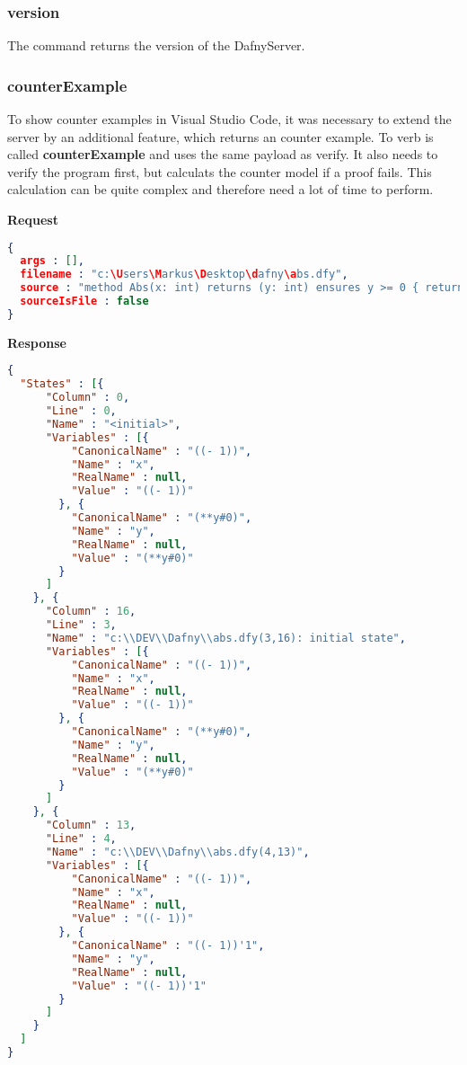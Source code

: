 \subsubsection{version}
The command returns the version of the DafnyServer.  


\subsubsection{counterExample}
To show counter examples in Visual Studio Code, it was necessary to extend the server by an additional feature, which returns an counter example. To verb is called \textbf{counterExample} and uses the same payload as verify. It also needs to verify the program first, but calculats the counter model if a proof fails. This calculation can be quite complex and therefore need a lot of time to perform.  

\textbf{Request}
\begin{lstlisting}[language=json,firstnumber=1]
{
  args : [],
  filename : "c:\Users\Markus\Desktop\dafny\abs.dfy",
  source : "method Abs(x: int) returns (y: int) ensures y >= 0 { return x;}",
  sourceIsFile : false
}

\end{lstlisting}

\textbf{Response}
\begin{lstlisting}[language=json,firstnumber=1]
{
  "States" : [{
      "Column" : 0,
      "Line" : 0,
      "Name" : "<initial>",
      "Variables" : [{
          "CanonicalName" : "((- 1))",
          "Name" : "x",
          "RealName" : null,
          "Value" : "((- 1))"
        }, {
          "CanonicalName" : "(**y#0)",
          "Name" : "y",
          "RealName" : null,
          "Value" : "(**y#0)"
        }
      ]
    }, {
      "Column" : 16,
      "Line" : 3,
      "Name" : "c:\\DEV\\Dafny\\abs.dfy(3,16): initial state",
      "Variables" : [{
          "CanonicalName" : "((- 1))",
          "Name" : "x",
          "RealName" : null,
          "Value" : "((- 1))"
        }, {
          "CanonicalName" : "(**y#0)",
          "Name" : "y",
          "RealName" : null,
          "Value" : "(**y#0)"
        }
      ]
    }, {
      "Column" : 13,
      "Line" : 4,
      "Name" : "c:\\DEV\\Dafny\\abs.dfy(4,13)",
      "Variables" : [{
          "CanonicalName" : "((- 1))",
          "Name" : "x",
          "RealName" : null,
          "Value" : "((- 1))"
        }, {
          "CanonicalName" : "((- 1))'1",
          "Name" : "y",
          "RealName" : null,
          "Value" : "((- 1))'1"
        }
      ]
    }
  ]
}



\end{lstlisting}